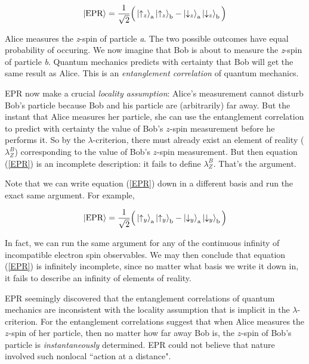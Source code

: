 \documentclass[a4paper]{article}
\begin{document}
\begin{equation}\label{EPR}
\Ket{\textrm{EPR}} = \frac{1}{\sqrt 2}\Big( \Ket{\uparrow_z}_{\rm a}\Ket{\uparrow_z}_{\rm b}-\Ket{\downarrow_z}_{\rm a}\Ket{\downarrow_z}_{\rm b}\Big)
\end{equation}

Alice measures the \textit{z}-spin of particle \textit{a}. The two possible outcomes have equal probability of occuring. We now imagine that Bob is about to measure the \textit{z}-spin of particle \textit{b}. Quantum mechanics predicts with certainty that Bob will get the same result as Alice. This is an \textit{entanglement correlation} of quantum mechanics.

EPR now make a crucial \textit{locality assumption}: Alice's measurement cannot disturb Bob's particle because Bob and his particle are (arbitrarily) far away. But the instant that Alice measures her particle, she can use the entanglement correlation to predict with certainty the value of Bob's $z$-spin measurement before he performs it. So by the $\lambda$-criterion, there must already exist an element of reality ($\lambda_Z^B$) corresponding to the value of Bob's $z$-spin measurement. But then equation (\ref{EPR}) is an incomplete description: it fails to define $\lambda_Z^B$. That's the argument.

Note that we can write equation (\ref{EPR}) down in a different basis and run the exact same argument. For example, 

\begin{equation}\label{EPR2}
\Ket{\textrm{EPR}} = \frac{1}{\sqrt 2}\Big( \Ket{\uparrow_y}_{\rm a}\Ket{\uparrow_y}_{\rm b}-\Ket{\downarrow_y}_{\rm a}\Ket{\downarrow_y}_{\rm b}\Big)
\end{equation}

In fact, we can run the same argument for any of the continuous infinity of incompatible electron spin observables. We may then conclude that equation (\ref{EPR}) is infinitely incomplete, since no matter what basis we write it down in, it fails to describe an infinity of elements of reality.

EPR seemingly discovered that the entanglement correlations of quantum mechanics are inconsistent with the locality assumption that is implicit in the $\lambda$-criterion. For the entanglement correlations suggest that when Alice measures the $z$-spin of her particle, then no matter how far away Bob is, the $z$-spin of Bob's particle is \textit{instantaneously} determined. EPR could not believe that nature involved such nonlocal ``action at a distance". 
\end{document}
